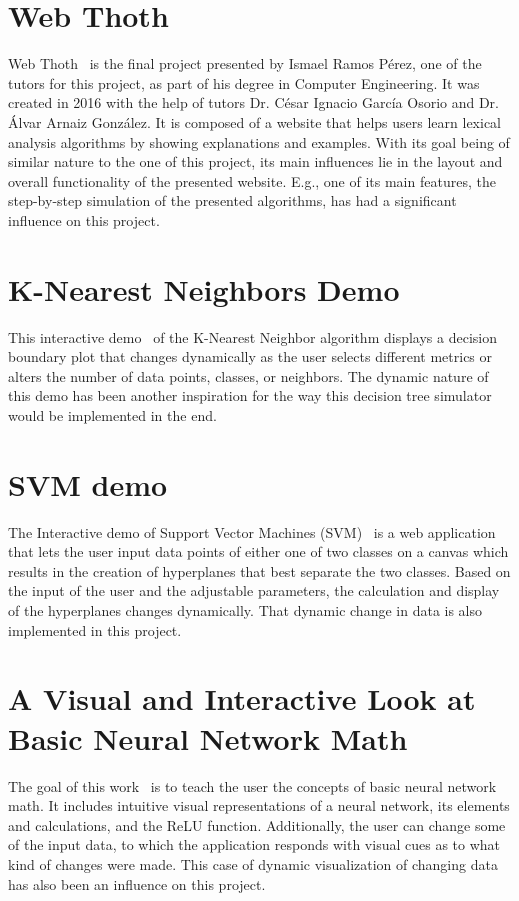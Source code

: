 
\section{Web Thoth}
Web Thoth~\cite{web_thoth} is the final project presented by Ismael Ramos Pérez, one of the tutors for this project, as part of his degree in Computer Engineering. It was created in 2016 with the help of tutors Dr. César Ignacio García Osorio and Dr. Álvar Arnaiz González. It is composed of a website that helps users learn lexical analysis algorithms by showing explanations and examples. With its goal being of similar nature to the one of this project, its main influences lie in the layout and overall functionality of the presented website. E.g., one of its main features, the step-by-step simulation of the presented algorithms, has had a significant influence on this project.

\section{K-Nearest Neighbors Demo}
This interactive demo~\cite{knn_demo} of the K-Nearest Neighbor algorithm displays a decision boundary plot that changes dynamically as the user selects different metrics or alters the number of data points, classes, or neighbors. The dynamic nature of this demo has been another inspiration for the way this decision tree simulator would be implemented in the end.

\section{SVM demo}
The Interactive demo of Support Vector Machines (SVM)~\cite{svm_demo} is a web application that lets the user input data points of either one of two classes on a canvas which results in the creation of hyperplanes that best separate the two classes. Based on the input of the user and the adjustable parameters, the calculation and display of the hyperplanes changes dynamically. That dynamic change in data is also implemented in this project.

\section{A Visual and Interactive Look at Basic Neural Network Math}
The goal of this work~\cite{neural_network_math_demo} is to teach the user the concepts of basic neural network math. It includes intuitive visual representations of a neural network, its elements and calculations, and the ReLU function. Additionally, the user can change some of the input data, to which the application responds with visual cues as to what kind of changes were made. This case of dynamic visualization of changing data has also been an influence on this project.
